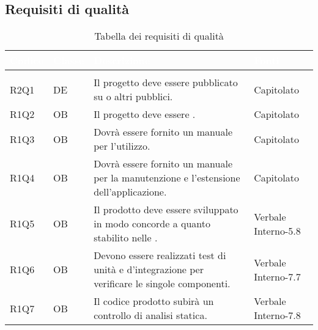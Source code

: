 \subsection{Requisiti di qualità}
{
\setlength\arrayrulewidth{1pt}
\begin{longtable}{C{2cm} | C{1.5cm} | C{9cm} | C{3.3cm}}
		\textcolor{white}{\textbf{Codice}} & 
		\textcolor{white}{\textbf{Classe}} & 
		\textcolor{white}{\textbf{Descrizione}} & 
		\textcolor{white}{\textbf{Fonti}} \\
		\endfirsthead
	    \\
	    \endfoot
	    \caption{Tabella dei requisiti di qualità}
	    \endlastfoot

R2Q1 & DE & Il progetto deve essere pubblicato su  o altri  pubblici. & Capitolato \\
R1Q2 & OB & Il progetto deve essere . & Capitolato\\
R1Q3 & OB & Dovrà essere fornito un manuale per l'utilizzo. & Capitolato\\
R1Q4 & OB & Dovrà essere fornito un manuale per la manutenzione e l'estensione dell'applicazione. & Capitolato\\
R1Q5 & OB & Il prodotto deve essere sviluppato in modo concorde a quanto stabilito nelle \NdPv{}. & Verbale Interno-5.8\\
R1Q6 & OB & Devono essere realizzati test di unità e d'integrazione per verificare le singole componenti. & Verbale Interno-7.7\\
R1Q7 & OB & Il codice prodotto subirà un controllo di analisi statica.  & Verbale Interno-7.8\\

\end{longtable}
}

\newpage